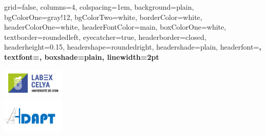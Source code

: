 \documentclass[portrait,final,a0paper]{baposter}
\begin{document}



\begin{poster}%
  {
  grid=false,
  columns=4,
  colspacing=1em,
  background=plain,%
  bgColorOne=gray!12,%
  bgColorTwo=white,
  borderColor=white,%
  headerColorOne=white,%
  headerFontColor=main,%
  boxColorOne=white,%
  textborder=roundedleft,%
  eyecatcher=true,
  headerborder=closed,
  headerheight=0.15\textheight,
  headershape=roundedright,
  headershade=plain,%
  headerfont=\Large\bfseries,%
  textfont={\setlength{\parindent}{1.5em}},
  boxshade=plain,
  linewidth=2pt
  }
  {
  \begin{minipage}{3cm}
  	\centering
 	 \includegraphics[width=3cm]{logo/LABEX_CELYA.jpg} \\
 	  \includegraphics[trim={0 3cm 0 3cm},clip=true,width=3cm]{logo/logo_ADAPT.png}\\~\\


\end{minipage}}
\end{poster}
\end{document}
